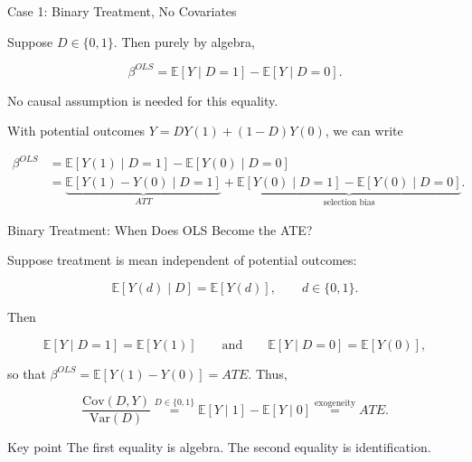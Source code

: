 \documentclass[aspectratio=169,11pt]{beamer}
\begin{document}

\begin{frame}{Case 1: Binary Treatment, No Covariates}
\small

Suppose \(D\in\{0,1\}\). Then purely by algebra,

\[
\boxed{
\beta^{OLS}
=
\mathbb{E}[Y\mid D=1]
-
\mathbb{E}[Y\mid D=0].
}
\]

No causal assumption is needed for this equality.

\medskip

With potential outcomes
\(Y = D Y(1)+(1-D)Y(0)\),
we can write

\[
\begin{aligned}
\beta^{OLS}
&=
\mathbb{E}[Y(1)\mid D=1]
-
\mathbb{E}[Y(0)\mid D=0]
\\[2mm]
&=
\underbrace{
\mathbb{E}[Y(1)-Y(0)\mid D=1]
}_{ATT}
+
\underbrace{
\mathbb{E}[Y(0)\mid D=1]
-
\mathbb{E}[Y(0)\mid D=0]
}_{\text{selection bias}}.
\end{aligned}
\]

\end{frame}


\begin{frame}{Binary Treatment: When Does OLS Become the ATE?}
\small

Suppose treatment is mean independent of potential outcomes:

\[
\mathbb{E}[Y(d)\mid D]
=
\mathbb{E}[Y(d)],
\qquad d\in\{0,1\}.
\]

Then

\[
\mathbb{E}[Y\mid D=1]
=
\mathbb{E}[Y(1)]
\qquad\text{and}\qquad
\mathbb{E}[Y\mid D=0]
=
\mathbb{E}[Y(0)],
\]

so that \(\beta^{OLS}=\mathbb{E}[Y(1)-Y(0)]=ATE\). Thus,

\[
\boxed{
\frac{\mathrm{Cov}(D,Y)}{\mathrm{Var}(D)}
\overset{D\in\{0,1\}}{=}
\mathbb{E}[Y\mid 1]-\mathbb{E}[Y\mid 0]
\overset{\text{exogeneity}}{=}
ATE.
}
\]

\begin{block}{Key point}
The first equality is algebra.
The second equality is identification.
\end{block}

\end{frame}


\end{document}
